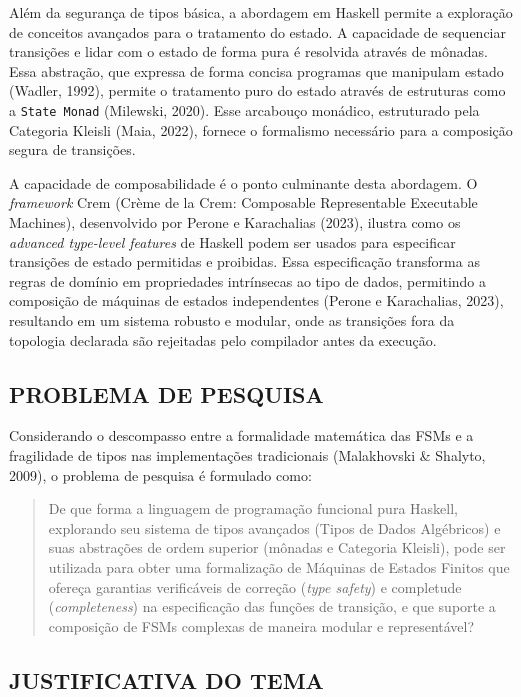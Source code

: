 \documentclass[12pt,a4paper]{article}
\begin{document}
Além da segurança de tipos básica, a abordagem em Haskell permite a exploração de conceitos avançados para o tratamento do estado. A capacidade de sequenciar transições e lidar com o estado de forma pura é resolvida através de mônadas. Essa abstração, que expressa de forma concisa programas que manipulam estado (Wadler, 1992), permite o tratamento puro do estado através de estruturas como a \texttt{State Monad} (Milewski, 2020). Esse arcabouço monádico, estruturado pela Categoria Kleisli (Maia, 2022), fornece o formalismo necessário para a composição segura de transições.

A capacidade de composabilidade é o ponto culminante desta abordagem. O \textit{framework} Crem (Crème de la Crem: Composable Representable Executable Machines), desenvolvido por Perone e Karachalias (2023), ilustra como os \textit{advanced type-level features} de Haskell podem ser usados para especificar transições de estado permitidas e proibidas. Essa especificação transforma as regras de domínio em propriedades intrínsecas ao tipo de dados, permitindo a composição de máquinas de estados independentes (Perone e Karachalias, 2023), resultando em um sistema robusto e modular, onde as transições fora da topologia declarada são rejeitadas pelo compilador antes da execução.

\subsection{PROBLEMA DE PESQUISA}

Considerando o descompasso entre a formalidade matemática das FSMs e a fragilidade de tipos nas implementações tradicionais (Malakhovski \& Shalyto, 2009), o problema de pesquisa é formulado como:

\begin{quote}
   De que forma a linguagem de programação funcional pura Haskell, explorando seu sistema de tipos avançados (Tipos de Dados Algébricos) e suas abstrações de ordem superior (mônadas e Categoria Kleisli), pode ser utilizada para obter uma formalização de Máquinas de Estados Finitos que ofereça garantias verificáveis de correção (\textit{type safety}) e completude (\textit{completeness}) na especificação das funções de transição, e que suporte a composição de  FSMs complexas  de maneira modular e representável? 
\end{quote}

\subsection{JUSTIFICATIVA DO TEMA}
\end{document}
